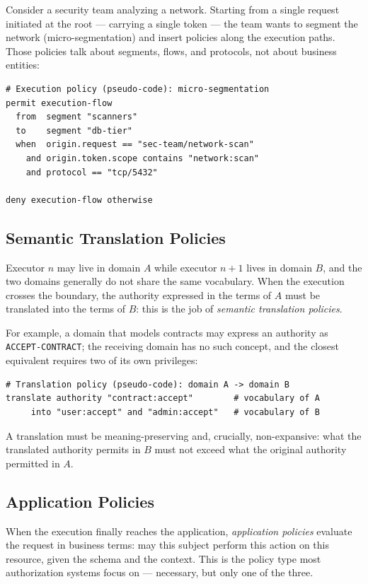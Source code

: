 \documentclass[11pt,a4paper]{article}
\newcommand{\term}[1]{\emph{#1}}                 %
\newcommand{\field}[1]{\texttt{#1}}              %
\begin{document}
Consider a security team analyzing a network. Starting from a single
request initiated at the root --- carrying a single token --- the team
wants to segment the network (micro-segmentation) and insert policies
along the execution paths. Those policies talk about segments, flows, and
protocols, not about business entities:

\begin{lstlisting}
# Execution policy (pseudo-code): micro-segmentation
permit execution-flow
  from  segment "scanners"
  to    segment "db-tier"
  when  origin.request == "sec-team/network-scan"
    and origin.token.scope contains "network:scan"
    and protocol == "tcp/5432"

deny execution-flow otherwise
\end{lstlisting}

\subsection{Semantic Translation Policies}

Executor $n$ may live in domain $A$ while executor $n+1$ lives in domain
$B$, and the two domains generally do not share the same vocabulary. When
the execution crosses the boundary, the authority expressed in the terms
of $A$ must be translated into the terms of $B$: this is the job of
\term{semantic translation policies}.

For example, a domain that models contracts may express an authority as
\field{ACCEPT-CONTRACT}; the receiving domain has no such concept, and
the closest equivalent requires two of its own privileges:

\begin{lstlisting}
# Translation policy (pseudo-code): domain A -> domain B
translate authority "contract:accept"        # vocabulary of A
     into "user:accept" and "admin:accept"   # vocabulary of B
\end{lstlisting}

A translation must be meaning-preserving and, crucially, non-expansive:
what the translated authority permits in $B$ must not exceed what the
original authority permitted in $A$.

\subsection{Application Policies}

When the execution finally reaches the application, \term{application
policies} evaluate the request in business terms: may this subject
perform this action on this resource, given the schema and the context.
This is the policy type most authorization systems focus on --- necessary,
but only one of the three.
\end{document}
